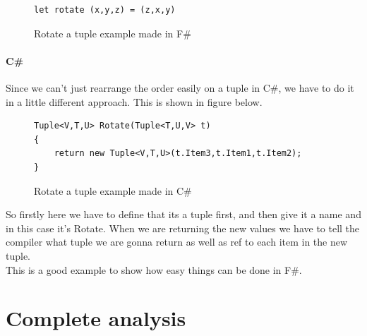 \documentclass[12pt, a4paper]{article}
\begin{document}
\begin{figure}[!h]
\begin{lstlisting}
let rotate (x,y,z) = (z,x,y)
\end{lstlisting}
\caption{Rotate a tuple example made in F\#}
\label{fig:RotateTupleFSharp}
\end{figure}

\paragraph{C\#}
Since we can’t just rearrange the order easily on a tuple in C\#, we have to do it in a little different approach. This is shown in figure below.\\

\begin{figure}[!h]
\begin{lstlisting}
Tuple<V,T,U> Rotate(Tuple<T,U,V> t) 
{ 
    return new Tuple<V,T,U>(t.Item3,t.Item1,t.Item2); 
}
\end{lstlisting}
\caption{Rotate a tuple example made in C\#}
\label{fig:RotateTupleCSharp}
\end{figure}

So firstly here we have to define that its a tuple first, and then give it a name and in this case it’s Rotate. When we are returning the new values we have to tell the compiler what tuple we are gonna return as well as ref to each item in the new tuple.\\

This is a good example to show how easy things can be done in F\#.

\newpage
\section{Complete analysis}




\end{document}
